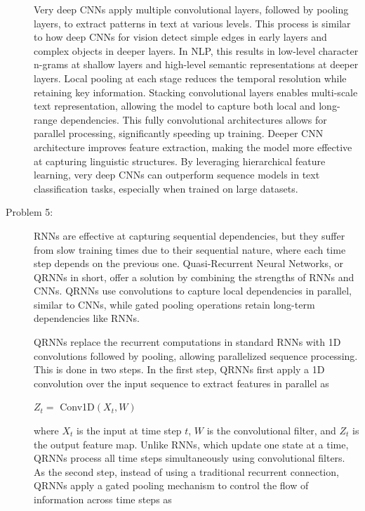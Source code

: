 \documentclass[10pt]{article}
\begin{document}
\begin{description}
Very deep CNNs apply multiple convolutional layers, followed by pooling layers, to extract patterns in text at various levels. 
This process is similar to how deep CNNs for vision detect simple edges in early layers and complex objects in deeper layers. 
In NLP, this results in low-level character n-grams at shallow layers and high-level semantic representations at deeper layers.
Local pooling at each stage reduces the temporal resolution while retaining key information.
Stacking convolutional layers enables multi-scale text representation, allowing the model to capture both local and long-range dependencies.
This fully convolutional architectures allows for parallel processing, significantly speeding up training.
Deeper CNN architecture improves feature extraction, making the model more effective at capturing linguistic structures.
By leveraging hierarchical feature learning, very deep CNNs can outperform sequence models in text classification tasks, especially when trained on large datasets.

\pagebreak

\item[Problem 5:]  \hfill %

RNNs are effective at capturing sequential dependencies, but they suffer from slow training times due to their sequential nature, 
where each time step depends on the previous one. Quasi-Recurrent Neural Networks, or QRNNs in short, offer a solution by combining the strengths of RNNs and CNNs.
QRNNs use convolutions to capture local dependencies in parallel, similar to CNNs, while gated pooling operations retain long-term dependencies like RNNs.

QRNNs replace the recurrent computations in standard RNNs with 1D convolutions followed by pooling, allowing parallelized sequence processing. 
This is done in two steps. In the first step, QRNNs first apply a 1D convolution over the input sequence to extract features in parallel as

\begin{center}
    $Z_t = $ Conv1D$(X_t, W)$ 
\end{center}

where $X_t$ is the input at time step $t$, $W$ is the convolutional filter, and $Z_t$ is the output feature map. 
Unlike RNNs, which update one state at a time, QRNNs process all time steps simultaneously using convolutional filters. 
As the second step, instead of using a traditional recurrent connection, QRNNs apply a gated pooling mechanism to control the flow of information across time steps as


\end{description}
\end{document}
